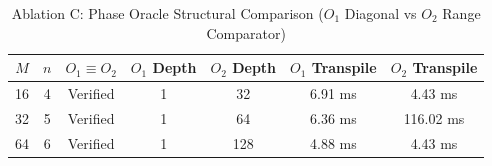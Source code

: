\begin{table}[t]
\centering
\caption{Ablation C: Phase Oracle Structural Comparison ($O_1$ Diagonal vs $O_2$ Range Comparator)}
\label{tab:ablation_oracle}
\begin{tabular}{ccccccc}
\hline
\textbf{$M$} & \textbf{$n$} & \textbf{$O_1 \equiv O_2$} & \textbf{$O_1$ Depth} & \textbf{$O_2$ Depth} & \textbf{$O_1$ Transpile} & \textbf{$O_2$ Transpile} \\
\hline
16 & 4 & Verified & 1 & 32 & 6.91 ms & 4.43 ms \\
32 & 5 & Verified & 1 & 64 & 6.36 ms & 116.02 ms \\
64 & 6 & Verified & 1 & 128 & 4.88 ms & 4.43 ms \\
\hline
\end{tabular}
\end{table}
